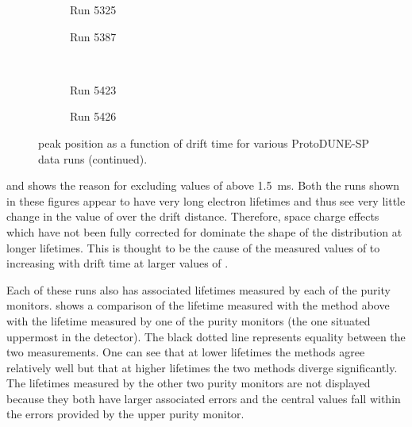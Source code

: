 \begin{figure}[t]
	\begin{subfigure}[t]{.49\textwidth}
		\begin{adjustbox}{max totalsize=\linewidth, center}
			
		\end{adjustbox}
		\caption{Run 5325}
	\end{subfigure}
	\hfill
	\begin{subfigure}[t]{.49\textwidth}
		\begin{adjustbox}{max totalsize=\linewidth, center}
			
		\end{adjustbox}
		\caption{Run 5387}
	\end{subfigure}	
	\\
	\begin{subfigure}[t]{.49\textwidth}
		\begin{adjustbox}{max totalsize=\linewidth, center}
			
		\end{adjustbox}
		\caption{Run 5423}
		\label{fig:dqdxPeak2:3}
	\end{subfigure}
	\hfill
	\begin{subfigure}[t]{.49\textwidth}
		\begin{adjustbox}{max totalsize=\linewidth, center}
			
		\end{adjustbox}
		\caption{Run 5426}
		\label{fig:dqdxPeak2:4}
	\end{subfigure}
	\caption[\dqdx peak position as a function of drift time for various ProtoDUNE-SP data runs (continued)]{\dqdx peak position as a function of drift time for various ProtoDUNE-SP data runs (continued).}
	\label{fig:dqdxPeak2}
\end{figure}

 and  shows the reason for excluding values of \tdrift above \SI{1.5}{\ms}.
Both the runs shown in these figures appear to have very long electron lifetimes and thus see very little change in the value of \dqdxMPV over the drift distance.
Therefore, space charge effects which have not been fully corrected for dominate the shape of the distribution at longer lifetimes.
This is thought to be the cause of the measured values of \dqdxMPV to increasing with drift time at larger values of \tdrift.

Each of these runs also has associated lifetimes measured by each of the purity monitors.
 shows a comparison of the lifetime measured with the method above with the lifetime measured by one of the purity monitors (the one situated uppermost in the detector).
The black dotted line represents equality between the two measurements.
One can see that at lower lifetimes the methods agree relatively well but that at higher lifetimes the two methods diverge significantly.
The lifetimes measured by the other two purity monitors are not displayed because they both have larger associated errors and the central values fall within the errors provided by the upper purity monitor.

